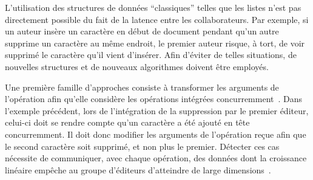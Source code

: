 %     


L'utilisation des structures de données ``classiques'' telles que les listes
n'est pas directement possible du fait de la latence entre les
collaborateurs. Par exemple, si un auteur insère un caractère en début de document
pendant qu'un autre supprime un caractère au même endroit, le premier auteur
risque, à tort, de voir supprimé le caractère qu'il vient d'insérer. Afin d'éviter
de telles situations, de nouvelles structures et de nouveaux algorithmes doivent
être employés.

Une première famille d'approches consiste à transformer les arguments de
l'opération afin qu'elle considère les opérations intégrées
concurremment~\cite{sun1998operational}. Dans l'exemple précédent, lors de
l'intégration de la suppression par le premier éditeur, celui-ci doit se rendre
compte qu'un caractère a été ajouté en tête concurremment. Il doit donc modifier
les arguments de l'opération reçue afin que le second caractère soit supprimé,
et non plus le premier. Détecter ces cas nécessite de communiquer, avec chaque
opération, des données dont la croissance linéaire empêche au groupe d'éditeurs
d'atteindre de large dimensions~\cite{charronbost1991concerning,
  sun2009contextbased}.

